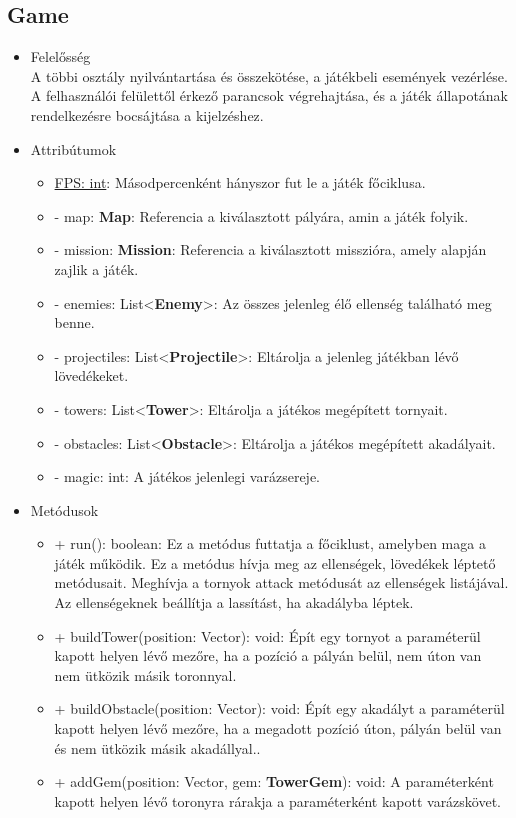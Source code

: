 \subsection{Game}
\begin{itemize}
\item Felelősség\\
A többi osztály nyilvántartása és összekötése, a játékbeli események vezérlése. A felhasználói felülettől érkező parancsok végrehajtása, és a játék állapotának rendelkezésre bocsájtása a kijelzéshez.
\item Attribútumok
	\begin{itemize}
		\item \underline{FPS: int}: Másodpercenként hányszor fut le a játék főciklusa.
		\item - map: \textbf{Map}: Referencia a kiválasztott pályára, amin a játék folyik.
		\item - mission: \textbf{Mission}: Referencia a kiválasztott misszióra, amely alapján zajlik a játék.
		\item - enemies: List<\textbf{Enemy}>: Az összes jelenleg élő ellenség található meg benne.
		\item - projectiles: List<\textbf{Projectile}>: Eltárolja a jelenleg játékban lévő lövedékeket.
		\item - towers: List<\textbf{Tower}>: Eltárolja a játékos megépített tornyait.
		\item - obstacles: List<\textbf{Obstacle}>: Eltárolja a játékos megépített akadályait.
		\item - magic: int: A játékos jelenlegi varázsereje.
	\end{itemize}
\item Metódusok
	\begin{itemize}
		\item + run(): boolean: Ez a metódus futtatja a főciklust, amelyben maga a játék működik. Ez a metódus hívja meg az ellenségek, lövedékek léptető metódusait. Meghívja a tornyok attack metódusát az ellenségek listájával. Az ellenségeknek beállítja a lassítást, ha akadályba léptek.
		\item + buildTower(position: Vector): void: Épít egy tornyot a paraméterül kapott helyen lévő mezőre, ha a pozíció a pályán belül, nem úton van nem ütközik másik toronnyal.
		\item + buildObstacle(position: Vector): void: Épít egy akadályt a paraméterül kapott helyen lévő mezőre, ha a megadott pozíció úton, pályán belül van és nem ütközik másik akadállyal..
		\item + addGem(position: Vector, gem: \textbf{TowerGem}): void: A paraméterként kapott helyen lévő toronyra rárakja a paraméterként kapott varázskövet.

\end{itemize}
\end{itemize}
